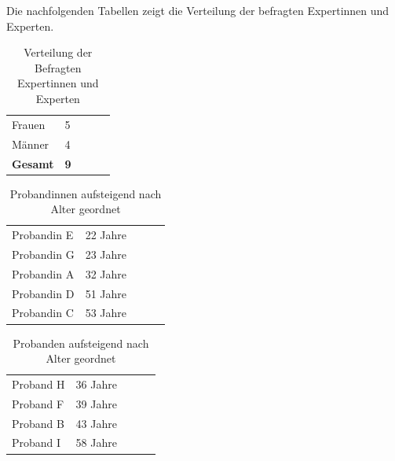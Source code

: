 Die nachfolgenden Tabellen zeigt die Verteilung der befragten Expertinnen und Experten.

\begin{table}[h]
	\centering
	\label{my-label}
	\begin{tabular}{lllll}
		\cline{1-2}
		\multicolumn{1}{|l|}{Frauen}          & \multicolumn{1}{l|}{5}          &             \\ \cline{1-2}
		\multicolumn{1}{|l|}{Männer}          & \multicolumn{1}{l|}{4}          &            \\ \cline{1-2}
		\multicolumn{1}{|l|}{\textbf{Gesamt}} & \multicolumn{1}{l|}{\textbf{9}} & \textbf{}  \\ \cline{1-2}
	\end{tabular}
	\caption{Verteilung der Befragten Expertinnen und Experten}
\end{table}


\begin{table}[h]
	\centering
	\label{my-label}
	\begin{tabular}{|l|l|lll}
		\cline{1-2}
		Probandin E              & 22 Jahre              &             \\ \cline{1-2}
		Probandin G              & 23 Jahre              &    \\ \cline{1-2}
		Probandin A              & 32 Jahre              &    \\ \cline{1-2}
		Probandin D              & 51 Jahre              &    \\ \cline{1-2}
		Probandin C              & 53 Jahre              &    \\ \cline{1-2}
	\end{tabular}
	
	\caption{Probandinnen aufsteigend nach Alter geordnet}
\end{table}

\begin{table}[h]
	\centering
	\label{my-label}
	\begin{tabular}{|l|l|lll}
		\cline{1-2}
		Proband H     & 36 Jahre              &             \\ \cline{1-2}
		Proband F      & 39 Jahre              &    \\ \cline{1-2}
		Proband B              & 43 Jahre              &    \\ \cline{1-2}
		Proband I              & 58 Jahre              &    \\ \cline{1-2}
	\end{tabular}
	\caption{Probanden aufsteigend nach Alter geordnet}
\end{table}



